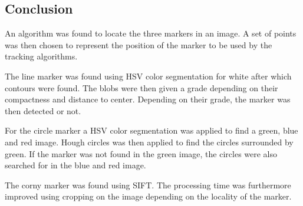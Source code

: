 \subsection{Conclusion}
An algorithm was found to locate the three markers in an image.
A set of points was then chosen to represent the position of the marker to be used by the tracking algorithms.

The line marker was found using HSV color segmentation for white after which contours were found.
The blobs were then given a grade depending on their compactness and distance to center.
Depending on their grade, the marker was then detected or not.

For the circle marker a HSV color segmentation was applied to find a green, blue and red image.
Hough circles was then applied to find the circles surrounded by green.
If the marker was not found in the green image, the circles were also searched for in the blue and red image.

The corny marker was found using SIFT.
The processing time was furthermore improved using cropping on the image depending on the locality of the marker.



